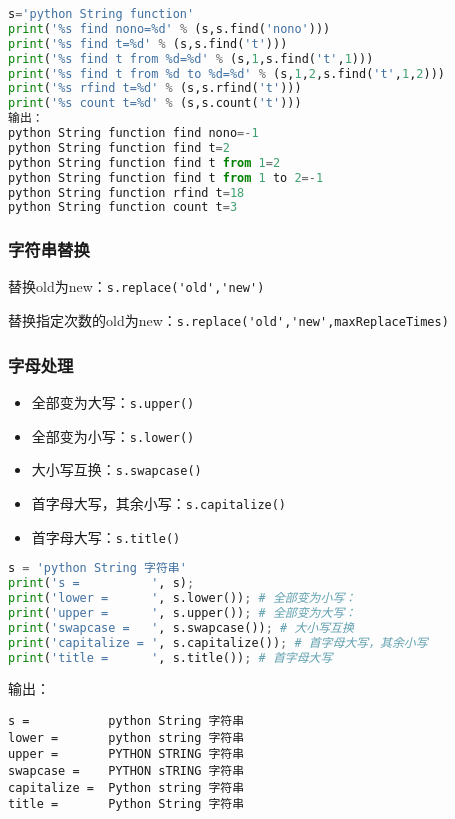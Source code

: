 \begin{lstlisting}[language=python]
s='python String function'
print('%s find nono=%d' % (s,s.find('nono')))
print('%s find t=%d' % (s,s.find('t')))
print('%s find t from %d=%d' % (s,1,s.find('t',1)))
print('%s find t from %d to %d=%d' % (s,1,2,s.find('t',1,2)))
print('%s rfind t=%d' % (s,s.rfind('t')))
print('%s count t=%d' % (s,s.count('t')))
输出：
python String function find nono=-1
python String function find t=2
python String function find t from 1=2
python String function find t from 1 to 2=-1
python String function rfind t=18
python String function count t=3
\end{lstlisting}

\subsubsection{字符串替换}

替换old为new：\verb|s.replace('old','new')|

替换指定次数的old为new：\verb|s.replace('old','new',maxReplaceTimes)|


\subsubsection{字母处理}
\begin{itemize}
\item 全部变为大写：\verb|s.upper()|
\item 全部变为小写：\verb|s.lower()|
\item 大小写互换：\verb|s.swapcase()|
\item 首字母大写，其余小写：\verb|s.capitalize()|
\item 首字母大写：\verb|s.title()|
\end{itemize}

\begin{lstlisting}[language=python]
s = 'python String 字符串'
print('s =          ', s);
print('lower =      ', s.lower()); # 全部变为小写：
print('upper =      ', s.upper()); # 全部变为大写：
print('swapcase =   ', s.swapcase()); # 大小写互换
print('capitalize = ', s.capitalize()); # 首字母大写，其余小写
print('title =      ', s.title()); # 首字母大写
\end{lstlisting}
输出：
\begin{lstlisting}
s =           python String 字符串
lower =       python string 字符串
upper =       PYTHON STRING 字符串
swapcase =    PYTHON sTRING 字符串
capitalize =  Python string 字符串
title =       Python String 字符串
\end{lstlisting}

